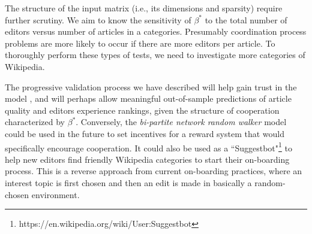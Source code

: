 The structure of the input matrix (i.e., its dimensions and sparsity) require further scrutiny. We aim to know the sensitivity of $\beta^{*}$ to the total number of editors versus number of articles in a categories. Presumably coordination process problems are more likely to occur if there are more editors per article. To thoroughly perform these types of tests, we need to investigate more categories of Wikipedia.

The progressive validation process we have described will help gain trust in the model \cite{sornette2007}, and will perhaps allow meaningful out-of-sample predictions of article quality and editors experience rankings, given the structure of cooperation characterized by $\beta^{*}$. Conversely, the {\it bi-partite network random walker} model could be used in the future to set incentives for a reward system that would specifically encourage cooperation. It could also be used as a ``Suggestbot"\footnote{https://en.wikipedia.org/wiki/User:Suggestbot} to help new editors find friendly Wikipedia categories to start their on-boarding process. This is a reverse approach from current on-boarding practices, where an interest topic is first chosen and then an edit is made in basically a random-chosen environment.



